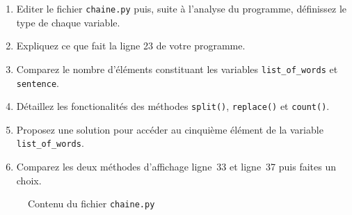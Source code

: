 \begin{enumerate}

\item Editer le  fichier \texttt{chaine.py} puis,
  suite à l'analyse du programme, définissez le type de chaque variable.

\item Expliquez ce que fait la ligne 23 de votre programme.

\item Comparez le nombre d'éléments constituant les variables \texttt{list\_of\_words} et  \texttt{sentence}.

\item Détaillez les fonctionalités des méthodes \texttt{split()}, \texttt{replace()} et \texttt{count()}.

\item Proposez une solution pour accéder au cinquième élément de la variable \texttt{list\_of\_words}.

\item Comparez les deux méthodes d'affichage ligne~33 et ligne~37 puis faites un choix.


\end{enumerate}


\begin{figure}  
  
  \caption{Contenu du fichier \texttt{chaine.py}}
  \label{polynome_chaine}
\end{figure}
